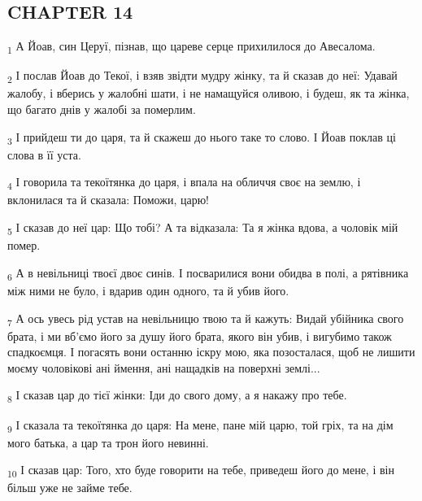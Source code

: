 \subsection{CHAPTER 14}
\begin{tcolorbox}
\textsubscript{1} А Йоав, син Церуї, пізнав, що цареве серце прихилилося до Авесалома.
\end{tcolorbox}
\begin{tcolorbox}
\textsubscript{2} І послав Йоав до Текої, і взяв звідти мудру жінку, та й сказав до неї: Удавай жалобу, і вберись у жалобні шати, і не намащуйся оливою, і будеш, як та жінка, що багато днів у жалобі за померлим.
\end{tcolorbox}
\begin{tcolorbox}
\textsubscript{3} І прийдеш ти до царя, та й скажеш до нього таке то слово. І Йоав поклав ці слова в її уста.
\end{tcolorbox}
\begin{tcolorbox}
\textsubscript{4} І говорила та текоїтянка до царя, і впала на обличчя своє на землю, і вклонилася та й сказала: Поможи, царю!
\end{tcolorbox}
\begin{tcolorbox}
\textsubscript{5} І сказав до неї цар: Що тобі? А та відказала: Та я жінка вдова, а чоловік мій помер.
\end{tcolorbox}
\begin{tcolorbox}
\textsubscript{6} А в невільниці твоєї двоє синів. І посварилися вони обидва в полі, а рятівника між ними не було, і вдарив один одного, та й убив його.
\end{tcolorbox}
\begin{tcolorbox}
\textsubscript{7} А ось увесь рід устав на невільницю твою та й кажуть: Видай убійника свого брата, і ми вб'ємо його за душу його брата, якого він убив, і вигубимо також спадкоємця. І погасять вони останню іскру мою, яка позосталася, щоб не лишити моєму чоловікові ані ймення, ані нащадків на поверхні землі...
\end{tcolorbox}
\begin{tcolorbox}
\textsubscript{8} І сказав цар до тієї жінки: Іди до свого дому, а я накажу про тебе.
\end{tcolorbox}
\begin{tcolorbox}
\textsubscript{9} І сказала та текоїтянка до царя: На мене, пане мій царю, той гріх, та на дім мого батька, а цар та трон його невинні.
\end{tcolorbox}
\begin{tcolorbox}
\textsubscript{10} І сказав цар: Того, хто буде говорити на тебе, приведеш його до мене, і він більш уже не займе тебе.
\end{tcolorbox}
